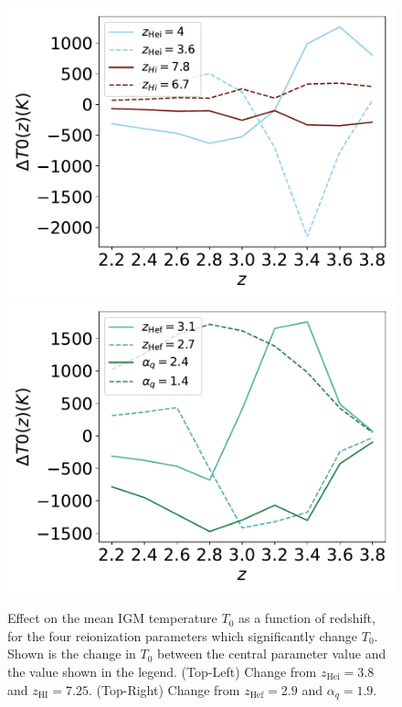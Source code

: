 \documentclass[a4paper,11pt]{article}
\begin{document}
\begin{figure}
    \centering
    \includegraphics[width=0.48\columnwidth]{figures/single_param_t0_hi_.pdf}
    \includegraphics[width=0.48\columnwidth]{figures/single_param_t0_hef_.pdf} \\
    \caption{Effect on the mean IGM temperature $T_0$ as a function of redshift, for the four reionization parameters which significantly change $T_0$. Shown is the change in $T_0$ between the central parameter value and the value shown in the legend. (Top-Left) Change from $z_\mathrm{Hei} = 3.8$ and $z_\mathrm{HI} = 7.25$. (Top-Right) Change from $z_\mathrm{Hef} = 2.9$ and $\alpha_q = 1.9$.}
    \label{fig:meantempfluxpower}
\end{figure}
\end{document}
